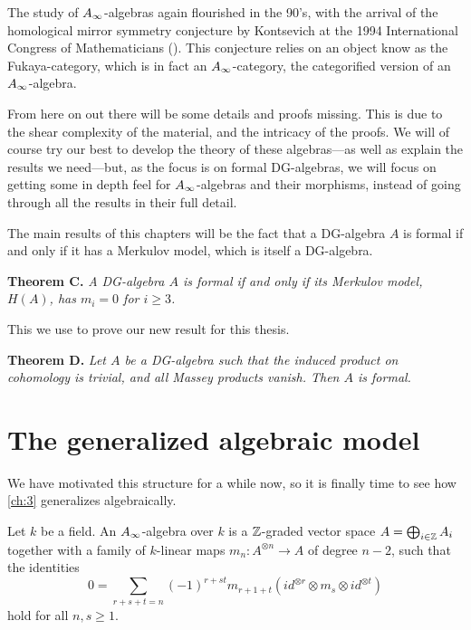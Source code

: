The study of $A_{\infty}$-algebras again flourished in the 90's, with the arrival of the homological mirror symmetry conjecture by Kontsevich at the 1994 International Congress of Mathematicians (\cite{kontsevich}). This conjecture relies on an object know as the Fukaya-category, which is in fact an $A_{\infty}$-category, the categorified version of an $A_{\infty}$-algebra.

From here on out there will be some details and proofs missing. This is due to the shear complexity of the material, and the intricacy of the proofs. We will of course try our best to develop the theory of these algebras---as well as explain the results we need---but, as the focus is on formal DG-algebras, we will focus on getting some in depth feel for $A_{\infty}$-algebras and their morphisms, instead of going through all the results in their full detail.

The main results of this chapters will be the fact that a DG-algebra $A$ is formal if and only if it has a Merkulov model, which is itself a DG-algebra. 

\textbf{Theorem C.} \textit{A DG-algebra $A$ is formal if and only if its Merkulov model, $H(A)$, has $m_i=0$ for $i\geq 3$.}

This we use to prove our new result for this thesis. 

\textbf{Theorem D.} \textit{Let $A$ be a DG-algebra such that the induced product on cohomology is trivial, and all Massey products vanish. Then $A$ is formal.}

\section{The generalized algebraic model}

We have motivated this structure for a while now, so it is finally time to see how \cref{ch:3} generalizes algebraically.

\begin{definition}
\label{def:A_infinity-algebra}
Let $k$ be a field. An $A_{\infty}$-algebra over $k$ is a $\mathbb{Z}$-graded vector space $A=\bigoplus_{i\in \mathbb{Z}}A_i$ together with a family of $k$-linear maps $m_n : A^{\otimes n}\rightarrow A$ of degree $n-2$, such that the identities 
\begin{equation*}
    0=\sum_{r+s+t = n}(-1)^{r+st}m_{r+1+t}(id^{\otimes r}\otimes m_s \otimes id^{\otimes t})
\end{equation*}
hold for all $n, s\geq 1$. 
\end{definition}

